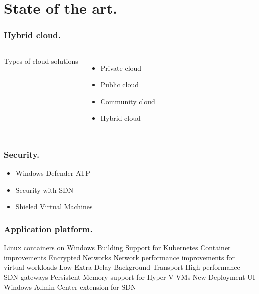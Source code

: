 \documentclass[aspectratio=169]{beamer}
\begin{document}
\section{State of the art.}
\begin{frame}
\frametitle{Hybrid cloud.}  
\begin{columns}[c]
    \colorbox{hgdarkgreen}{Types of cloud solutions}
    \begin{itemize}
        \item Private cloud
        \item Public cloud
        \item Community cloud
        \item Hybrid cloud
    \end{itemize}

    
\end{columns}
\end{frame}
\begin{frame}
\frametitle{Security.}  
\vspace*{\fill}
    \begin{itemize}
        \item[] \colorbox{hgorange}{Windows Defender ATP}
        \item[] \colorbox{hgblue}{Security with SDN}
        \item[] \colorbox{hglightgreen}{Shieled Virtual Machines}
    \end{itemize}
\vspace*{\fill}

\end{frame}
\begin{frame}
\frametitle{Application platform.}
    \vspace*{\fill}
    \colorbox{hgdarkgreen}{Linux containers on Windows}
    \colorbox{hgpink}{Building Support for Kubernetes}
    \colorbox{hgochre}{Container improvements}
    \colorbox{hgorange}{Encrypted Networks}
    \colorbox{hgpurple}{Network performance improvements for virtual workloads}
    \colorbox{hgblue}{Low Extra Delay Background Transport}
    \colorbox{hglightgreen}{High-performance SDN gateways}
    \colorbox{hgbrown}{Persistent Memory support for Hyper-V VMs}
    \colorbox{hggrey}{New Deployment UI}
    \colorbox{hgyellow}{Windows Admin Center extension for SDN}
    \vspace*{\fill}
\end{frame}
\end{document}
